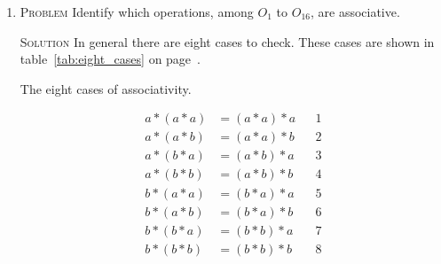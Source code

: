 \documentclass[draft,twoside]{amsart}
\newcommand{\Solution}{\textsc{Solution}\xspace}
\newcommand{\Problem}{\textsc{Problem}\xspace}
\begin{document}
\begin{enumerate}
   \item \Problem Identify which operations, among $O_1$ to $O_{16}$, are 
   associative.

   \noindent \Solution 
   In general there are eight cases to check. These cases are shown in
   table~\ref{tab:eight_cases} on page~\pageref{tab:eight_cases}.
%
   \begin{table}
   \caption{The eight cases of associativity.}
   \label{tab:eight_cases}
   \begin{align*}
      a * (a * a) & = (a * a) * a && 1\\
      a * (a * b) & = (a * a) * b && 2\\
      a * (b * a) & = (a * b) * a && 3\\
      a * (b * b) & = (a * b) * b && 4\\
      b * (a * a) & = (b * a) * a && 5\\
      b * (a * b) & = (b * a) * b && 6\\
      b * (b * a) & = (b * b) * a && 7\\
      b * (b * b) & = (b * b) * b && 8
   \end{align*}
   \end{table}


\end{enumerate}
\end{document}
